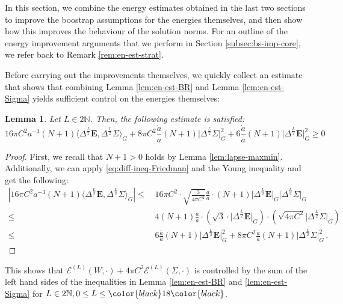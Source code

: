 \documentclass[11pt,leqno,textwidth=10cm]{amsart}
\numberwithin{equation}{section}
\theoremstyle{definition}
\newtheorem{remark}[definition]{Remark}
\theoremstyle{plain}
\newtheorem{lemma}[definition]{Lemma}
\newcommand{\1}{\mathbbm{1}}
\newcommand{\E}{\mathcal{E}}
\newcommand{\N}{\mathbb{N}}
\newcommand{\Lap}{\Delta}
\newcommand{\RE}{\bm{E}}
\newcommand{\change}[1]{\color{black}#1\color{black}}
\begin{document}
In this section, we combine the energy estimates obtained in the last two sections to improve the boostrap assumptions for the energies themselves, and then show how this improves the behaviour of the solution norms. For an outline of the energy improvement arguments that we perform in \change{Section \ref{subsec:bs-imp-core}}, we refer back to Remark \ref{rem:en-est-strat}.

Before carrying out the improvements themselves, we quickly collect an estimate that shows that combining Lemma \ref{lem:en-est-BR} and Lemma \ref{lem:en-est-Sigma} yields sufficient control on the energies themselves:

\begin{lemma}\label{lem:en-error-cancellation} Let $L\in 2\N$. Then, the following estimate is satisfied:
\begin{equation}
16\pi C^2a^{-3}(N+1)\langle\Lap^\frac{L}2\RE,\Lap^{\frac{L}2}\Sigma\rangle_G+8\pi C^2\frac{\dot{a}}a(N+1)\lvert\Lap^\frac{L}2\Sigma\rvert_G^2+6\frac{\dot{a}}a(N+1)\lvert\Lap^\frac{L}2\RE\rvert_G^2\geq 0
\end{equation}
\end{lemma}
\begin{proof}
First, we recall that $N+1>0$ holds by Lemma \ref{lem:lapse-maxmin}. Additionally, we can apply \eqref{eq:diff-ineq-Friedman} and the Young inequality and get the following:
\begin{align*}
\left\lvert 16\pi C^2a^{-3}(N+1)\langle\Lap^\frac{L}2\RE,\Lap^{\frac{L}2}\Sigma\rangle_G\right\rvert\leq&\,16\pi C^2\cdot\sqrt{\frac3{4\pi C^2}}\frac{\dot{a}}a\cdot (N+1)\lvert\Lap^{\frac{L}2}\RE\rvert_G\lvert\Lap^{\frac{L}2}\Sigma\rvert_G\\
\leq&\,4(N+1)\frac{\dot{a}}a \cdot\left(\sqrt{3}\cdot\lvert\Lap^\frac{L}2\RE\rvert_G\right)\cdot\left(\sqrt{4\pi C^2}\lvert\Lap^{\frac{L}2}\Sigma\rvert_G\right)\\
\leq%
&\,6\frac{\dot{a}}a(N+1)\lvert\Lap^\frac{L}2\RE\rvert_G^2+8\pi C^2\frac{\dot{a}}a(N+1)\lvert\Lap^\frac{L}2\Sigma\rvert_G^2\,.
\end{align*}
\end{proof}
This shows that $\E^{(L)}(W,\cdot)+4\pi C^2\E^{(L)}(\Sigma,\cdot)$ is controlled by the sum of the left hand sides of the inequalities in Lemma \ref{lem:en-est-BR} and \ref{lem:en-est-Sigma} for $L\in 2\N, 0\leq L\leq \change{18}$. %
\end{document}
